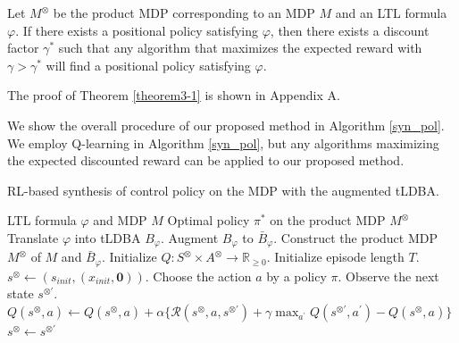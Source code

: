 \begin{theorem}
  Let $M^{\otimes}$ be the product MDP corresponding to an MDP $M$ and an LTL formula $\varphi$. If there exists a positional policy satisfying $\varphi$, then there exists a discount factor $\gamma^{\ast}$ such that any algorithm that maximizes the expected reward with $\gamma > \gamma^{\ast}$ will find a positional policy satisfying $\varphi$.
  \label{theorem3-1}
\end{theorem}
The proof of Theorem \ref{theorem3-1} is shown in Appendix A.


We show the overall procedure of our proposed method in Algorithm \ref{syn_pol}. We employ Q-learning in Algorithm \ref{syn_pol}, but any algorithms maximizing the expected discounted reward can be applied to our proposed method.
\begin{algorithm}
 \caption{RL-based synthesis of control policy on the MDP with the augmented tLDBA.}
 \begin{algorithmic}[1]
 \renewcommand{\algorithmicrequire}{\textbf{Input:}}
 \renewcommand{\algorithmicensure}{\textbf{Output:}}
 \REQUIRE LTL formula $\varphi$ and MDP $M$
 \ENSURE  Optimal policy $\pi^{\ast}$ on the product MDP $M^{\otimes}$
 \STATE Translate $\varphi$ into tLDBA $B_{\varphi}$.
  \STATE Augment $B_{\varphi}$ to $\bar{B}_{\varphi}$.
  \STATE Construct the product MDP $M^{\otimes}$ of $M$ and $\bar{B}_{\varphi}$.
  \STATE Initialize $Q:S^{\otimes} \times A^{\otimes} \rightarrow \mathbb{R}_{\geq 0}$.
  \STATE Initialize episode length $T$.
  \STATE $s^{\otimes} \leftarrow (s_{init},(x_{init},\bm{0}))$.
  \STATE Choose the action $a$ by a policy $\pi$.
  \STATE Observe the next state $s^{\otimes \prime}$.
  \STATE $Q(s^{\otimes},a) \leftarrow Q(s^{\otimes},a) + \alpha \{ \mathcal{R}(s^{\otimes},a,s^{\otimes \prime}) + \gamma \max_{a^{\prime}}Q(s^{\otimes \prime},a^{\prime}) - Q(s^{\otimes},a) \}$
  \STATE $s^{\otimes} \leftarrow s^{\otimes \prime}$
  \ENDFOR
  \ENDWHILE
 \end{algorithmic}
 \label{syn_pol}
\end{algorithm}

